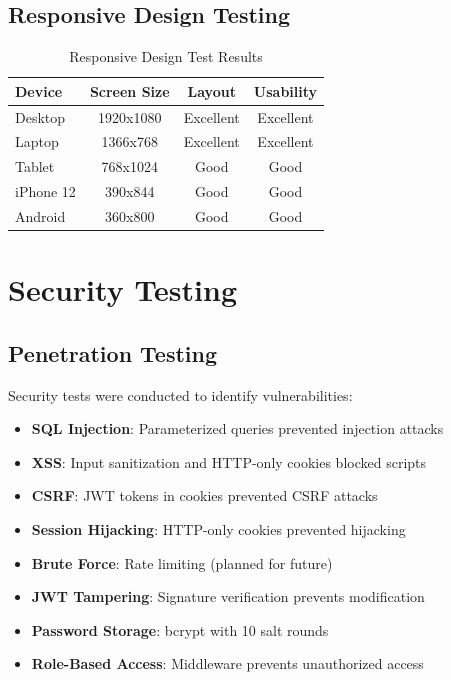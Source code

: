 \subsection{Responsive Design Testing}

\begin{table}[H]
    \centering
    \small
    \setlength{\tabcolsep}{3pt}
    \begin{tabular}{|l|c|c|c|}
        \hline
        \textbf{Device} & \textbf{Screen Size} & \textbf{Layout} & \textbf{Usability} \\
        \hline
        Desktop & 1920x1080 & Excellent & Excellent \\
        \hline
        Laptop & 1366x768 & Excellent & Excellent \\
        \hline
        Tablet & 768x1024 & Good & Good \\
        \hline
        iPhone 12 & 390x844 & Good & Good \\
        \hline
        Android & 360x800 & Good & Good \\
        \hline
    \end{tabular}
    \caption{Responsive Design Test Results}
    \label{tab:responsive}
\end{table}

\section{Security Testing}

\subsection{Penetration Testing}
Security tests were conducted to identify vulnerabilities:

\begin{itemize}
    \item \textbf{SQL Injection}: Parameterized queries prevented injection attacks
    \item \textbf{XSS}: Input sanitization and HTTP-only cookies blocked scripts
    \item \textbf{CSRF}: JWT tokens in cookies prevented CSRF attacks
    \item \textbf{Session Hijacking}: HTTP-only cookies prevented hijacking
    \item \textbf{Brute Force}: Rate limiting (planned for future)
    \item \textbf{JWT Tampering}: Signature verification prevents modification
    \item \textbf{Password Storage}: bcrypt with 10 salt rounds
    \item \textbf{Role-Based Access}: Middleware prevents unauthorized access
\end{itemize}

